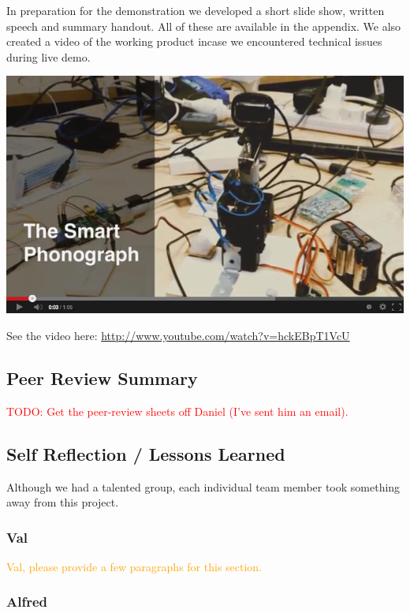 \documentclass[11pt,a4paper,titlepage]{report}
\begin{document}
In preparation for the  demonstration we developed a short slide show, written speech and summary handout. All of these are available in the appendix. We also created a video of the working product incase we encountered technical issues during live demo. 

\begin{center}
\href{http://www.youtube.com/watch?v=hckEBpT1VcU}{
    \includegraphics[width=\textwidth]{graphs/youtube.png}
}
\end{center}
See the video here: \url{http://www.youtube.com/watch?v=hckEBpT1VcU}



\subsection{Peer Review Summary}

\textcolor{red}{TODO: Get the peer-review sheets off Daniel (I've sent him an email).}


\subsection{Self Reflection / Lessons Learned}

Although we had a talented group, each individual team member took something away from this project.

\subsubsection{Val}

\textcolor{orange}{Val, please provide a few paragraphs for this section.}

\subsubsection{Alfred}
\end{document}
